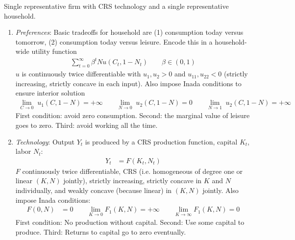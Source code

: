 \documentclass[12pt]{article}
\theoremstyle{plain}
\theoremstyle{definition}
\theoremstyle{remark}
\newcommand{\ra}{\rightarrow}
\newcommand{\sumtinfz}{\sum^\infty_{t=0}}
\begin{document}
Single representative firm with CRS technology and a single
representative household.
\begin{enumerate}
  \item \emph{Preferences}:
    Basic tradeoffs for household are (1) consumption today versus
    tomorrow, (2) consumption today versus leisure.
    Encode this in a household-wide utility function
    \begin{align*}
      \sumtinfz \beta^tNu(C_t,1-N_t)
      \qquad\beta\in(0,1)
    \end{align*}
    $u$ is continuously twice differentiable with $u_1,u_2>0$ and
    $u_{11},u_{22}<0$ (strictly increasing, strictly concave in each
    input).
    Also impose Inada conditions to ensure interior solution
    \begin{align*}
      \lim_{C\ra 0} \; u_1(C,1-N) = +\infty
      \qquad
      \lim_{N\ra 0} \; u_2(C,1-N) = 0
      \qquad
      \lim_{N\ra 1} \; u_2(C,1-N) = +\infty
    \end{align*}
    First condition: avoid zero consumption.
    Second: the marginal value of leisure goes to zero.
    Third: avoid working all the time.

  \item \emph{Technology}:
    Output $Y_t$ is produced by a CRS production function, capital
    $K_t$, labor $N_t$:
    \begin{align*}
      Y_t &= F(K_t,N_t)
    \end{align*}
    $F$ continuously twice differentiable, CRS (i.e. homogeneous of
    degree one or linear $(K,N)$ jointly), strictly increasing, strictly
    concave in $K$ and $N$ individually, and weakly concave (because
    linear) in $(K,N)$ jointly. Also impose Inada conditions:
    \begin{align*}
      F(0,N) &= 0
      \qquad
      \lim_{K\ra 0} F_1(K,N) = +\infty
      \qquad
      \lim_{K\ra \infty} F_1(K,N) = 0
    \end{align*}
    First condition: No production without capital.
    Second: Use some capital to produce.
    Third: Returns to capital go to zero eventually.


\end{enumerate}
\end{document}
